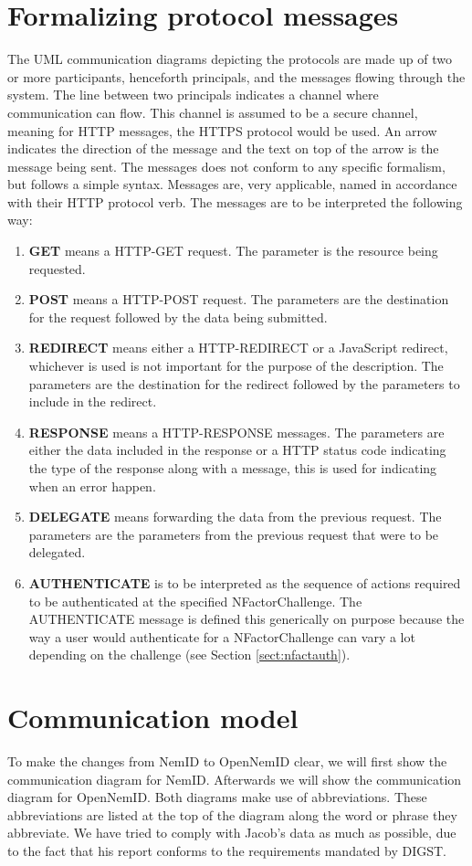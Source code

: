 \documentclass[twosided]{report}
\begin{document}
\section{Formalizing protocol messages}
The UML communication diagrams depicting the protocols are made up of two or more participants, henceforth principals, and the messages flowing through the system. The line between two principals indicates a channel where communication can flow. This channel is assumed to be a secure channel, meaning for HTTP messages, the HTTPS protocol would be used. An arrow indicates the direction of the message and the text on top of the arrow is the message being sent. The messages does not conform to any specific formalism, but follows a simple syntax. Messages are, very applicable, named in accordance with their HTTP protocol verb. The messages are to be interpreted the following way:
\begin{enumerate}
	\item[] \textbf{GET} means a HTTP-GET request. The parameter is the resource being requested.
	\item[] \textbf{POST} means a HTTP-POST request. The parameters are the destination for the request followed by the data being submitted.
	\item[] \textbf{REDIRECT} means either a HTTP-REDIRECT or a JavaScript redirect, whichever is used is not important for the purpose of the description. The parameters are the destination for the redirect followed by the parameters to include in the redirect.
	\item[] \textbf{RESPONSE} means a HTTP-RESPONSE messages. The parameters are either the data included in the response or a HTTP status code indicating the type of the response along with a message, this is used for indicating when an error happen.
	\item[] \textbf{DELEGATE} means forwarding the data from the previous request. The parameters are the parameters from the previous request that were to be delegated.
	\item[] \textbf{AUTHENTICATE} is to be interpreted as the sequence of actions required to be authenticated at the specified NFactorChallenge. The AUTHENTICATE message is defined this generically on purpose because the way a user would authenticate for a NFactorChallenge can vary a lot depending on the challenge (see Section \ref{sect:nfactauth}).
\end{enumerate}

\section{Communication model}
\label{sect:communicationmodal}
To make the changes from NemID to OpenNemID clear, we will first show the communication diagram for NemID. Afterwards we will show the communication diagram for OpenNemID. Both diagrams make use of abbreviations. These abbreviations are listed at the top of the diagram along the word or phrase they abbreviate. We have tried to comply with Jacob's data as much as possible, due to the fact that his report conforms to the requirements mandated by DIGST.
\end{document}
